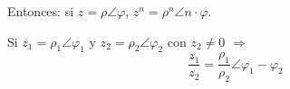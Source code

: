 \documentclass[11pt,a4paper]{article}
\begin{document}
Entonces: si $z=\rho\angle\varphi$, \quad $z^n=\rho^n\angle n\cdot\varphi$.

Si $z_1=\rho_1\angle\varphi_1$ y $z_2=\rho_2\angle\varphi_2$ con $z_2\neq0$ $\Rightarrow$
\[
\frac{z_1}{z_2}=\frac{\rho_1}{\rho_2}\angle\varphi_1-\varphi_2
\]

\end{document}
